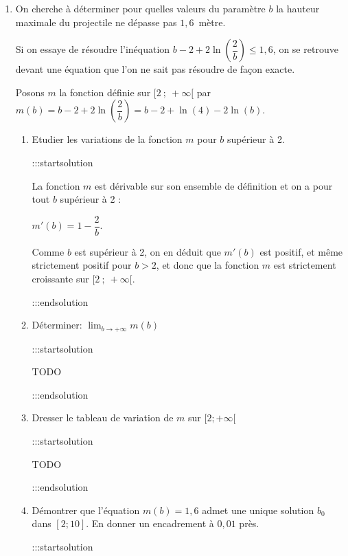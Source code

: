 \documentclass{cornouaille}
\begin{document}
\begin{enumerate}
\begin{enumerate}
Le maximum de la fonction $f$ s'établit bien à $b - 2 + 2 \ln\left(\dfrac{2}{b}\right) $.


:::endsolution
\end{enumerate}


\item  On cherche à déterminer pour quelles valeurs du paramètre $b$ la hauteur maximale du projectile ne dépasse
pas $1,6$~mètre.

Si on essaye de résoudre l'inéquation $b - 2 + 2 \ln\left(\dfrac{2}{b}\right) \leqslant 1,6$, on se retrouve devant une équation que l'on ne sait pas résoudre de façon exacte.

Posons $m$ la fonction définie sur $[2~;~+\infty[$ par $m(b) = b - 2 + 2 \ln\left(\dfrac{2}{b}\right) = b - 2 + \ln(4) - 2\ln(b)$.

\begin{enumerate}

\item Etudier les variations de la fonction $m$ pour $b$ supérieur à 2.


:::startsolution

La fonction $m$ est dérivable sur son ensemble de définition et on a pour tout $b$ supérieur à 2 :

$m'(b) = 1 - \dfrac{2}{b}$.

Comme $b$ est supérieur à 2, on en déduit que $m'(b)$ est positif, et même strictement positif pour $b>2$, et donc que la fonction $m$ est strictement croissante sur $[2~;~+\infty[$.


:::endsolution
\item Déterminer: $\lim_{b \to +\infty} m(b)$


:::startsolution

TODO


:::endsolution
\item Dresser le tableau de variation de $m$ sur $[2;+\infty[$


:::startsolution

TODO


:::endsolution

\item Démontrer que l'équation $m(b)=1,6$ admet une unique solution $b_0$ dans $[2;10]$. En donner un encadrement à $0,01$ près.


:::startsolution


\end{enumerate}
\end{enumerate}
\end{document}
